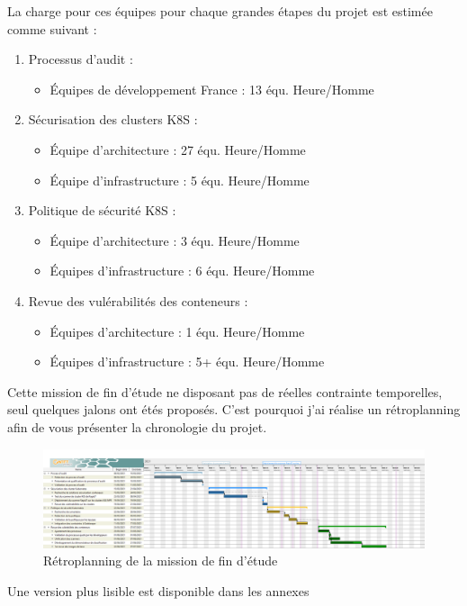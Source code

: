 \newpage

La charge pour ces équipes pour chaque grandes étapes du projet est estimée comme suivant :
\begin{enumerate}
    \item Processus d'audit :
    \begin{itemize}
        \renewcommand{\labelitemi}{•}
        \item Équipes de développement France : 13 équ. Heure/Homme
    \end{itemize}
    \item Sécurisation des clusters \ac{K8S} :
    \begin{itemize}
        \renewcommand{\labelitemi}{•}
        \item Équipe d'architecture : 27 équ. Heure/Homme
        \item Équipe d'infrastructure : 5 équ. Heure/Homme
    \end{itemize}
    \item Politique de sécurité \ac{K8S} :
    \begin{itemize}
        \renewcommand{\labelitemi}{•}
        \item Équipe d'architecture : 3 équ. Heure/Homme
        \item Équipes d'infrastructure : 6 équ. Heure/Homme
    \end{itemize}
    \item Revue des vulérabilités des conteneurs :
    \begin{itemize}
        \renewcommand{\labelitemi}{•}
        \item Équipes d'architecture : 1 équ. Heure/Homme
        \item Équipes d'infrastructure : 5+ équ. Heure/Homme
    \end{itemize}
\end{enumerate}

Cette mission de fin d'étude ne disposant pas de réelles contrainte temporelles, seul quelques jalons ont étés proposés.
C'est pourquoi j'ai réalise un rétroplanning afin de vous présenter la chronologie du projet.

\begin{figure}[h]
    \centering
    \includegraphics[width=\linewidth]{resources/img/retroplanning.png}
    \caption{Rétroplanning de la mission de fin d'étude}
\end{figure}

\begin{center}
    \colorbox{gray!15}{Une version plus lisible est disponible dans les annexes}
\end{center}